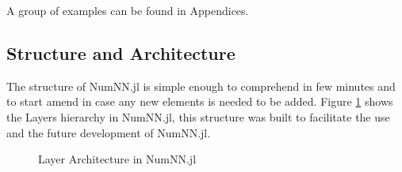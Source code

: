A group of examples can be found in Appendices.

\subsection{Structure and Architecture}

The structure of NumNN.jl is simple enough to comprehend in few minutes and to start amend in case any new elements is needed to be added. Figure \ref{fig:layerstruct} shows the Layers hierarchy in NumNN.jl, this structure was built to facilitate the use and the future development of NumNN.jl.

\begin{figure}[H]
	\centering
		
	\caption{Layer Architecture in NumNN.jl}\label{fig:layerstruct}
\end{figure}

